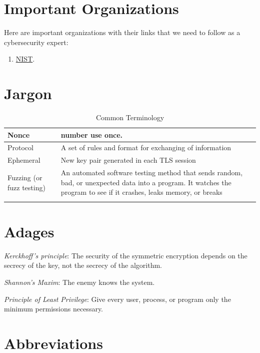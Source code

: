 \documentclass[a4paper, 12pt]{book} %
\begin{document}
\section{Important Organizations}
Here are important organizations with their links that we need to follow as a cybersecurity expert:
\begin{enumerate}
    \item \href{https://csrc.nist.gov/}{NIST}.
\end{enumerate}




\section{Jargon}
\begin{longtable}{|lp{10cm}|} \hline 
    Nonce & number use once. \\ \hline 
    Protocol & A set of rules and format for exchanging of information \\ \hline 
    Ephemeral & New key pair generated in each TLS session \\ \hline 
    Fuzzing (or fuzz testing) & An automated software testing method that sends random, bad, or unexpected data into a program. It watches the program to see if it crashes, leaks memory, or breaks \\ \hline 
    \caption{Common Terminology} 
\end{longtable}


\section{Adages}

\emph{Kerckhoff's principle}: The security of the symmetric encryption depends on the secrecy of the key, not the secrecy of the algorithm.

\emph{Shannon's Maxim}: The enemy knows the system.


\emph{Principle of Least Privilege}: Give every user, process, or program only the minimum permissions necessary.


\section{Abbreviations}
\end{document}
